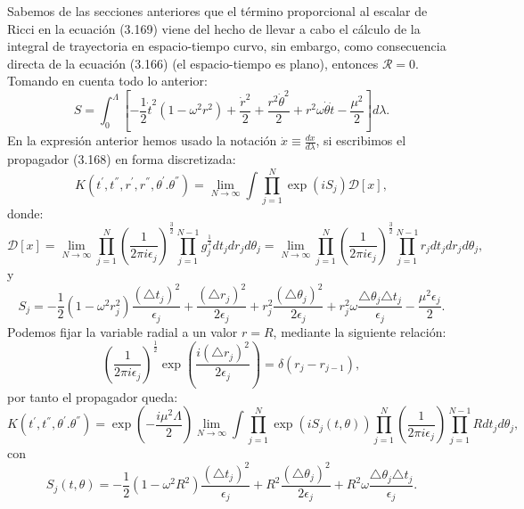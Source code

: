Sabemos de las secciones anteriores que el término proporcional al escalar de Ricci en la ecuación (3.169) viene del hecho de llevar a cabo el cálculo de la integral de trayectoria en espacio-tiempo curvo, sin embargo, como consecuencia directa de la ecuación (3.166) (el espacio-tiempo es plano), entonces $\mathcal{R}=0$. Tomando en cuenta todo lo anterior:
\begin{equation}
S=\int_{0}^{\Lambda}\left[-\frac{1}{2}\dot{t}^{2}(1-\omega^{2}r^{2})+\frac{\dot{r}^{2}}{2}+\frac{r^{2}\dot{\theta}^{2}}{2}+r^{2}\omega\dot{\theta}\dot{t}-\frac{\mu^{2}}{2}\right]d\lambda.
\end{equation} 
En la expresión anterior hemos usado la notación $\dot{x}\equiv\frac{dx}{d\lambda}$, si escribimos el propagador (3.168) en forma discretizada:
\begin{equation}
K(t^{'},t^{''},r^{'},r^{''},\theta^{'}.\theta^{''})=\lim_{N\to\infty}\int\prod_{j=1}^{N}\exp(iS_{j})\mathcal{D}[x],
\end{equation}
donde:
\begin{equation}
\mathcal{D}[x]=\lim_{N\to\infty}\prod_{j=1}^{N}\left(\frac{1}{2\pi i\epsilon_{j}}\right)^{\frac{3}{2}}\prod_{j=1}^{N-1}g_{j}^{\frac{1}{2}}dt_{j}dr_{j}d\theta_{j}=\lim_{N\to\infty}\prod_{j=1}^{N}\left(\frac{1}{2\pi i\epsilon_{j}}\right)^{\frac{3}{2}}\prod_{j=1}^{N-1}r_{j}dt_{j}dr_{j}d\theta_{j},
\end{equation}
y
\begin{equation}
S_{j}=-\frac{1}{2}(1-\omega^{2}r_{j}^{2})\frac{(\triangle t_{j})^{2}}{\epsilon_{j}}+\frac{(\triangle r_{j})^{2}}{2\epsilon_{j}}+r_{j}^{2}\frac{(\triangle\theta_{j})^{2}}{2\epsilon_{j}}+r_{j}^{2}\omega\frac{\triangle\theta_{j}\triangle t_{j}}{\epsilon_{j}}-\frac{\mu^{2}\epsilon_{j}}{2}.
\end{equation}
Podemos fijar la variable radial a un valor $r=R$, mediante la siguiente relación:
\begin{equation}
\left(\frac{1}{2\pi i\epsilon_{j}}\right)^{\frac{1}{2}}\exp\left(\frac{i(\triangle r_{j})^{2}}{2\epsilon_{j}}\right)=\delta(r_{j}-r_{j-1}),
\end{equation}
por tanto el propagador queda:
\begin{equation}
K(t^{'},t^{''},\theta^{'}.\theta^{''})=\exp\left(-\frac{i\mu^{2}\Lambda}{2}\right)\lim_{N\to\infty}\int\prod_{j=1}^{N}\exp(iS_{j}(t,\theta))\prod_{j=1}^{N}\left(\frac{1}{2\pi i\epsilon_{j}}\right)\prod_{j=1}^{N-1}Rdt_{j}d\theta_{j},
\end{equation}
con
\begin{equation}
S_{j}(t,\theta)=-\frac{1}{2}(1-\omega^{2}R^{2})\frac{(\triangle t_{j})^{2}}{\epsilon_{j}}+R^{2}\frac{(\triangle\theta_{j})^{2}}{2\epsilon_{j}}+R^{2}\omega\frac{\triangle\theta_{j}\triangle t_{j}}{\epsilon_{j}}.
\end{equation}
